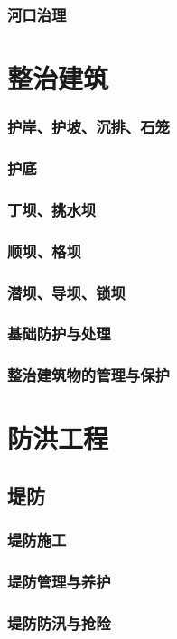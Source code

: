 \documentclass[UTF8]{../../ApplicationUniverse}
\begin{document}
    \subsubsection{河口治理}
\section{整治建筑}
    \subsubsection{护岸、护坡、沉排、石笼}
    \subsubsection{护底}
    \subsubsection{丁坝、挑水坝}
    \subsubsection{顺坝、格坝}
    \subsubsection{潜坝、导坝、锁坝}
    \subsubsection{基础防护与处理}
    \subsubsection{整治建筑物的管理与保护}
\section{防洪工程}
    \subsection{堤防}
        \subsubsection{堤防施工}
        \subsubsection{堤防管理与养护}
        \subsubsection{堤防防汛与抢险}
\end{document}
